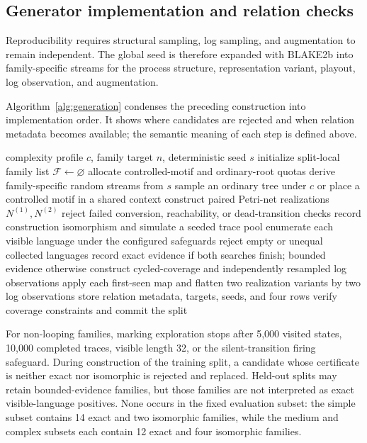 \documentclass[pdflatex,sn-basic]{sn-jnl}
\begin{document}
\subsection{Generator implementation and relation checks}\label{sec:generation}

Reproducibility requires structural sampling, log sampling, and augmentation to remain independent. The global seed is therefore expanded with BLAKE2b into family-specific streams for the process structure, representation variant, playout, log observation, and augmentation.

Algorithm~\ref{alg:generation} condenses the preceding construction into implementation order. It shows where candidates are rejected and when relation metadata becomes available; the semantic meaning of each step is defined above.

\begin{algorithm*}[!t]
\centering
\caption{Behavior-family generation}
\label{alg:generation}
\begin{algorithmic}[1]
\Require complexity profile $c$, family target $n$, deterministic seed $s$
\State initialize split-local family list $\mathcal{F}\leftarrow\varnothing$
\State allocate controlled-motif and ordinary-root quotas
  \State derive family-specific random streams from $s$
  \State sample an ordinary tree under $c$ or place a controlled motif in a shared context
  \State construct paired Petri-net realizations $N^{(1)},N^{(2)}$
  \State reject failed conversion, reachability, or dead-transition checks
    \State record construction isomorphism and simulate a seeded trace pool
  \Else
    \State enumerate each visible language under the configured safeguards
    \State reject empty or unequal collected languages
    \State record exact evidence if both searches finish; bounded evidence otherwise
  \EndIf
  \State construct cycled-coverage and independently resampled log observations
  \State apply each first-seen map and flatten two realization variants by two log observations
  \State store relation metadata, targets, seeds, and four rows
\EndWhile
\State verify coverage constraints and commit the split
\end{algorithmic}
\end{algorithm*}

For non-looping families, marking exploration stops after 5,000 visited states, 10,000 completed traces, visible length 32, or the silent-transition firing safeguard. During construction of the training split, a candidate whose certificate is neither exact nor isomorphic is rejected and replaced. Held-out splits may retain bounded-evidence families, but those families are not interpreted as exact visible-language positives. None occurs in the fixed evaluation subset: the simple subset contains 14 exact and two isomorphic families, while the medium and complex subsets each contain 12 exact and four isomorphic families.
\end{document}
